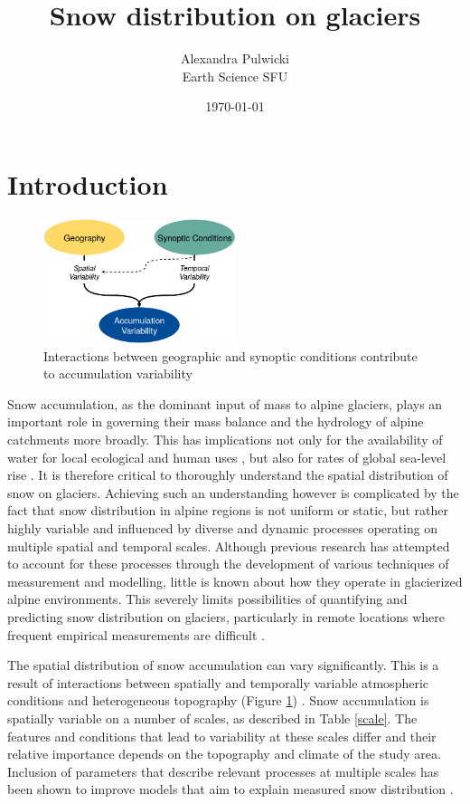 \documentclass[12pt]{article}
\begin{document}
\title{Snow distribution on glaciers}
\author{Alexandra Pulwicki \\ Earth Science SFU}
\date{\today}
\maketitle

\section{Introduction}

\begin{figure}
 \centering
      \includegraphics[width=0.5\textwidth]{flow1.png}
  \caption{Interactions between geographic and synoptic conditions contribute to accumulation variability}
	\label{flow1}
\end{figure}

Snow accumulation, as the dominant input of mass to alpine glaciers, plays an important role in governing their mass balance and the hydrology of alpine catchments more broadly. This has implications not only for the availability of water for local ecological and human uses \citep{ONeel2014,Barnett2005}, but also for rates of global sea-level rise \citep{Gardner2013}. It is therefore critical to thoroughly understand the spatial distribution of snow on glaciers. Achieving such an understanding however is complicated by the fact that snow distribution in alpine regions is not uniform or static, but rather highly variable and influenced by diverse and dynamic processes operating on multiple spatial and temporal scales. Although previous research has attempted to account for these processes through the development of various techniques of measurement and modelling, little is known about how they operate in glacierized alpine environments. This severely limits possibilities of quantifying and predicting snow distribution on glaciers, particularly in remote locations where frequent empirical measurements are difficult \citep{Nolan2015}.

The spatial distribution of snow accumulation can vary significantly. This is a result of interactions between spatially and temporally variable atmospheric conditions and heterogeneous topography (Figure \ref{flow1}) \citep{Deems2006, Liston2006}. Snow accumulation is spatially variable on a number of scales, as described in Table \ref{scale}. The features and conditions that lead to variability at these scales differ and their relative importance depends on the topography and climate of the study area. Inclusion of parameters that describe relevant processes at multiple scales has been shown to improve models that aim to explain measured snow distribution \citep{Marchand2005, Clark2011}. 
\end{document}
